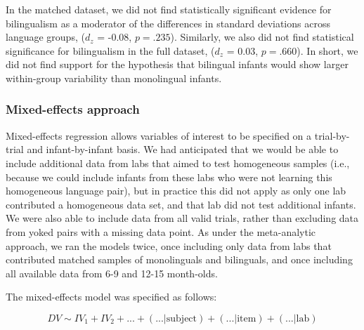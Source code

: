\documentclass[english,,man,floatsintext]{apa6}
\begin{document}
In the matched dataset, we did not find statistically significant evidence for bilingualism as a moderator of the differences in standard deviations across language groups, (\(d_z\) = -0.08, \(p = .235\)). Similarly, we also did not find statistical significance for bilingualism in the full dataset, (\(d_z\) = 0.03, \(p = .660\)). In short, we did not find support for the hypothesis that bilingual infants would show larger within-group variability than monolingual infants.

\hypertarget{mixed-effects-approach}{%
\subsubsection{Mixed-effects approach}\label{mixed-effects-approach}}

Mixed-effects regression allows variables of interest to be specified on a trial-by-trial and infant-by-infant basis. We had anticipated that we would be able to include additional data from labs that aimed to test homogeneous samples (i.e., because we could include infants from these labs who were not learning this homogeneous language pair), but in practice this did not apply as only one lab contributed a homogeneous data set, and that lab did not test additional infants. We were also able to include data from all valid trials, rather than excluding data from yoked pairs with a missing data point. As under the meta-analytic approach, we ran the models twice, once including only data from labs that contributed matched samples of monolinguals and bilinguals, and once including all available data from 6-9 and 12-15 month-olds.

The mixed-effects model was specified as follows:

\[DV \sim IV_1 + IV_2 + \text{...} + (\text{...} | \text{subject}) + (\text{...} | \text{item}) + (\text{...} | \text{lab})\]
\end{document}
